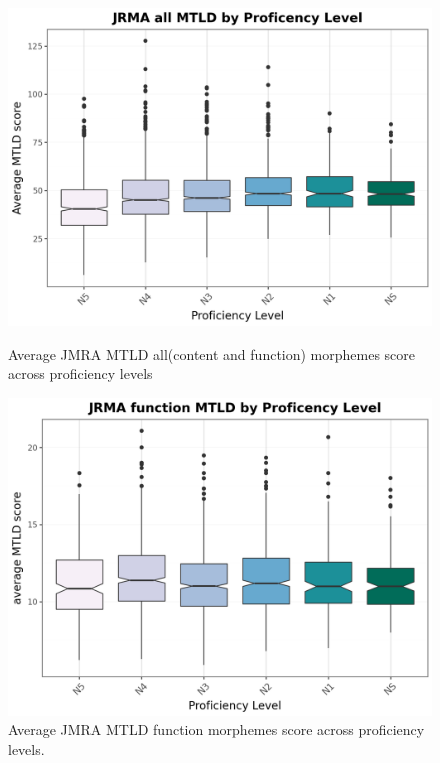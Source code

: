 \begin{figure}[htbp]
    \centering
    \begin{minipage}{.48\textwidth}
        \centering
    \includegraphics[scale=.4]{img/JMRA-MTLD-all}
    \caption[Average JMRA MTLD all score across proficiency levels]{Average JMRA MTLD all(content and function) morphemes score across proficiency levels}
        \label{fig:MTLDall}
    \end{minipage}
    \hfill
\begin{minipage}{.48\textwidth}
        \centering
        \includegraphics[scale=.4]{img/JMRA-MTLDfunction}
        \caption[Average JMRA MTLD function morphemes score across proficiency levels]{Average JMRA MTLD function morphemes score across proficiency levels.}
\label{fig:MTLDfunction}
\end{minipage}
    \end{figure}

